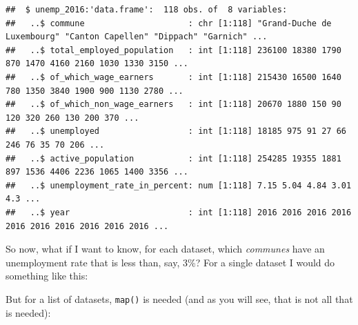\documentclass[]{gitbook}
\newenvironment{Shaded}{\begin{snugshade}}{\end{snugshade}}
\newcommand{\DecValTok}[1]{\textcolor[rgb]{0.00,0.00,0.81}{#1}}
\newcommand{\KeywordTok}[1]{\textcolor[rgb]{0.13,0.29,0.53}{\textbf{#1}}}
\newcommand{\NormalTok}[1]{#1}
\newcommand{\OperatorTok}[1]{\textcolor[rgb]{0.81,0.36,0.00}{\textbf{#1}}}
\newcommand{\StringTok}[1]{\textcolor[rgb]{0.31,0.60,0.02}{#1}}
\theoremstyle{definition}
\theoremstyle{definition}
\theoremstyle{definition}
\theoremstyle{remark}
\begin{document}
\begin{verbatim}
##  $ unemp_2016:'data.frame':  118 obs. of  8 variables:
##   ..$ commune                     : chr [1:118] "Grand-Duche de Luxembourg" "Canton Capellen" "Dippach" "Garnich" ...
##   ..$ total_employed_population   : int [1:118] 236100 18380 1790 870 1470 4160 2160 1030 1330 3150 ...
##   ..$ of_which_wage_earners       : int [1:118] 215430 16500 1640 780 1350 3840 1900 900 1130 2780 ...
##   ..$ of_which_non_wage_earners   : int [1:118] 20670 1880 150 90 120 320 260 130 200 370 ...
##   ..$ unemployed                  : int [1:118] 18185 975 91 27 66 246 76 35 70 206 ...
##   ..$ active_population           : int [1:118] 254285 19355 1881 897 1536 4406 2236 1065 1400 3356 ...
##   ..$ unemployment_rate_in_percent: num [1:118] 7.15 5.04 4.84 3.01 4.3 ...
##   ..$ year                        : int [1:118] 2016 2016 2016 2016 2016 2016 2016 2016 2016 2016 ...
\end{verbatim}

So now, what if I want to know, for each dataset, which \emph{communes}
have an unemployment rate that is less than, say, 3\%? For a single
dataset I would do something like this:

\begin{Shaded}
\end{Shaded}

But for a list of datasets, \texttt{map()} is needed (and as you will
see, that is not all that is needed):

\begin{Shaded}
\end{Shaded}
\end{document}
